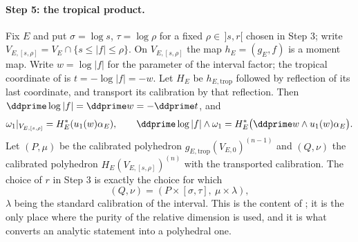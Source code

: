 \paragraph{Step 5: the tropical product.}
Fix $E$ and put $\sigma=\log s$, $\tau=\log\rho$ for a fixed
$\rho\in\,]s,r[$ chosen in Step 3; write
$V_{E,[s,\rho]}=V_E\cap\{s\le|f|\le\rho\}$.  On $V_{E,[s,\rho]}$ the map
$h_E=(g_E,f)$ is a moment map.  Write $w=\log|f|$ for the parameter of the
interval factor; the tropical coordinate of  is
$t=-\log|f|=-w$. Let $H_E$ be $h_{E,\mathrm{trop}}$ followed by reflection
of its last coordinate, and transport its calibration by that reflection.
Then $\ddprime\log|f|=\ddprime w=-\ddprime t$, and
\[
 \omega_1|_{V_{E,[s,\rho]}}=H_E^*(u_1(w)\alpha_E),
 \qquad
 \ddprime\log|f|\wedge\omega_1
 =H_E^*\bigl(\ddprime w\wedge u_1(w)\alpha_E\bigr).
\]
Let $(P,\mu)$ be the calibrated polyhedron
$g_{E,\mathrm{trop}}(V_{E,0})^{(n-1)}$ and $(Q,\nu)$ the calibrated
polyhedron $H_E(V_{E,[s,\rho]})^{(n)}$ with the transported calibration.
The choice of $r$ in
Step 3 is exactly the choice for which
\[
 (Q,\nu)=(P\times[\sigma,\tau],\ \mu\times\lambda),
\]
$\lambda$ being the standard calibration of the interval.  This is the
content of ; it is the only place where the purity
of the relative dimension is used, and it is what converts an analytic
statement into a polyhedral one.

